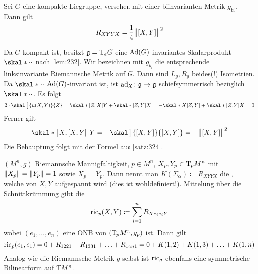 \begin{korollar}[{name=[Krümmungstensor einer kompakten Liegruppe]}]
	Sei $G$ eine kompakte Liegruppe, versehen mit einer biinvarianten Metrik $g_{\mathrm{bi}}$.
	Dann gilt
	\[
		R_{XYYX} = \frac{1}{4} \norm[\big]{\benbrace*{X,Y}}^2 
	\]
\end{korollar}
\begin{beweis}
	Da $G$ kompakt ist, besitzt $\mathfrak{g} = \Tmap_e G$ eine $\Ad(G)$-invariantes Skalarprodukt $\skal*{\cdot }{\cdot }$ nach \autoref{lem:232}.
	Wir bezeichnen mit $g_{b_i}$ die entsprechende linksinvariante Riemannsche Metrik auf $G$.
	Dann sind $L_g,R_g$ beides(!) Isometrien.
	Da $\skal*{\cdot}{\cdot }$ $\Ad(G)$-invariant ist, ist $\ad_X \colon \mathfrak{g} \to \mathfrak{g}$ schiefsymmetrisch bezüglich $\skal*{\cdot}{\cdot}$.
	Es folgt 
	\[
		2 \cdot \skal[\big]{u(X,Y)}{Z} = \skal*{ \benbrace*{Z,X}}{Y} + \skal*{\benbrace*{Z,Y}}{X} = -\skal*{X}{\benbrace*{Z,Y}} + \skal*{\benbrace*{Z,Y}}{X} =0
	\]
	Ferner gilt 
	\[
		\skal*{\benbrace[\big]{X,\benbrace*{X,Y}}}{Y} = - \skal[\big]{\benbrace*{X,Y}}{\benbrace*{X,Y}} = - \norm[\big]{\benbrace*{X,Y}}^2
	\]
	Die Behauptung folgt mit der Formel aus \autoref{satz:324}.
\end{beweis}

\begin{erinnerung}[{name=[Schnittkrümmung und Ricci-Krümmung]}]
	$(M^n,g)$ Riemannsche Mannigfaltigkeit, $p \in M^n$, $X_p,Y_p \in \Tmap_p M^n$ mit $\norm*{X_p} = \norm*{Y_p} = 1$ sowie $X_p \perp Y_p$.
	Dann nennt man $K(\Sigma_\alpha) \coloneqq R_{XYYX}$ die , welche von $X,Y$ aufgespannt wird (dies ist wohldefiniert!).
	Mittelung über die Schnittkrümmung gibt die 
	\[
		\ric_p(X,Y) \coloneqq \sum_{i=1}^{n} R_{Xe_i e_i Y}
	\]
	wobei $(e_1, \ldots ,e_n)$ eine ONB von $\enbrace*{\Tmap_p M^n,g_p}$ ist.
	Dann gilt
	\[
		\ric_p(e_1,e_1) = 0 + R_{1221} + R_{1331} + \ldots + R_{1nn1} = 0 + K(1,2) + K(1,3) + \ldots + K(1,n)
	\]
	Analog wie die Riemannsche Metrik $g$ selbst ist $\ric_g$ ebenfalls eine symmetrische Bilinearform auf $\Tmap M^n$.
\end{erinnerung}

